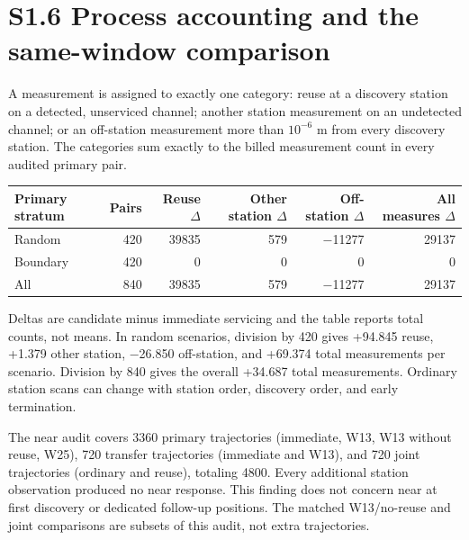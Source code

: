 \documentclass[11pt,letterpaper]{article}
\begin{document}
\section*{S1.6 Process accounting and the same-window comparison}

A measurement is assigned to exactly one category: reuse at a discovery station on a detected, unserviced channel; another station measurement on an undetected channel; or an off-station measurement more than $10^{-6}$ m from every discovery station. The categories sum exactly to the billed measurement count in every audited primary pair.

\begin{center}\begin{minipage}{\linewidth}\small
{}
\label{tab:s7}
\begin{tabular*}{\linewidth}{@{\extracolsep{\fill}}lrrrrr@{}}
\toprule
Primary stratum & Pairs & Reuse \ensuremath{\Delta} & \shortstack[l]{Other station\\$\Delta$} & \shortstack[l]{Off-station\\$\Delta$} & \shortstack[l]{All measures\\$\Delta$} \\
\midrule
Random & 420 & 39835 & 579 & \ensuremath{-}11277 & 29137 \\
Boundary & 420 & 0 & 0 & 0 & 0 \\
All & 840 & 39835 & 579 & \ensuremath{-}11277 & 29137 \\
\bottomrule
\end{tabular*}
\end{minipage}\end{center}
Deltas are candidate minus immediate servicing and the table reports total counts, not means. In random scenarios, division by 420 gives +94.845 reuse, +1.379 other station, \ensuremath{-}26.850 off-station, and +69.374 total measurements per scenario. Division by 840 gives the overall +34.687 total measurements. Ordinary station scans can change with station order, discovery order, and early termination.


The near audit covers 3360 primary trajectories (immediate, W13, W13 without reuse, W25), 720 transfer trajectories (immediate and W13), and 720 joint trajectories (ordinary and reuse), totaling 4800. Every additional station observation produced no near response. This finding does not concern near at first discovery or dedicated follow-up positions. The matched W13/no-reuse and joint comparisons are subsets of this audit, not extra trajectories.
\end{document}
